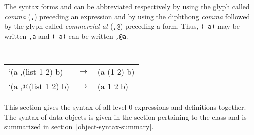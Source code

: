 \begin{optDefinition}
The syntax forms  and  can be
abbreviated respectively by using the glyph called {\em comma}
(\verb+,+) preceding an
expression and by using the diphthong {\em comma} followed by the glyph called
{\em commercial at} (\verb+,@+)
preceding a form.  Thus, {\tt ( a)} may be written {\tt ,a}
and {\tt ( a)} can be written {\tt ,@a}.
%
\examples
{\tt
\begin{tabular}{lll}
    `(a ,(list 1 2) b) & $\rightarrow$ & (a (1 2) b)\\
    `(a ,@(list 1 2) b) & $\rightarrow$ & (a 1 2 b)
\end{tabular}}
%
\end{optDefinition}

%
\begin{optDefinition}
\noindent
This section gives the syntax of all level-0 expressions and definitions
together.  The syntax of data objects is given in the section pertaining to the
class and is summarized in section~\ref{object-syntax-summary}.  \raggedbottom
%
%

%
\usebox{\genericLambdaSyntax}
\usebox{\lambdaSyntax}
\usebox{\functioncallSyntax}
\usebox{\quoteSyntax}
\usebox{\setqSyntax}
\usebox{\ifSyntax}
\usebox{\prognSyntax}
\usebox{\unwindprotectSyntax}
\usebox{\applySyntax}

%
\usebox{\condSyntax}
\usebox{\andSyntax}
\usebox{\orSyntax}
\usebox{\blockSyntax}
\usebox{\returnfromSyntax}
\usebox{\quasiquoteSyntax}
\usebox{\unquoteSyntax}
\usebox{\unquotespliceSyntax}

\flushbottom
\end{optDefinition}
